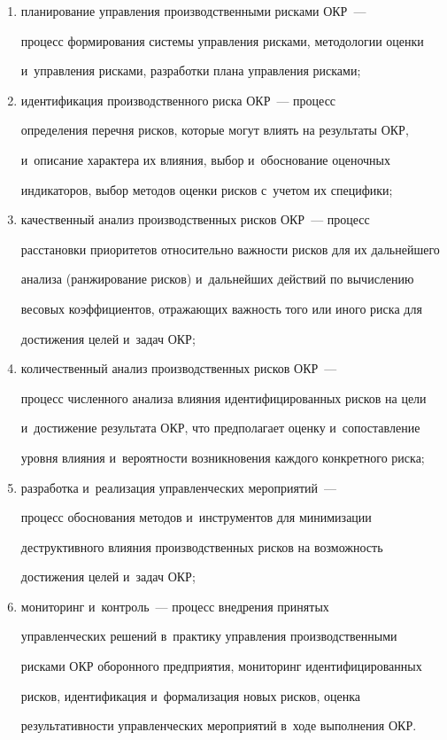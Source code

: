       \begin{enumerate}[(1)]


      \item  планирование управления производственными рисками ОКР~--- 


процесс формирования системы управ\-ле\-ния рисками, методологии оценки 


и~управ\-ле\-ния рисками, разработки плана управ\-ле\-ния рисками;


      \item идентификация производственного риска ОКР~--- процесс 


определения перечня рисков, которые могут влиять на результаты ОКР, 


и~описание характера их влияния, выбор и~обоснование оценочных 


индикаторов, выбор методов оценки рисков с~учетом их специфики; 


      \item качественный анализ производственных рисков ОКР~--- процесс 


расстановки приоритетов относительно важности рисков для их дальнейшего 


анализа (ранжирование рисков) и~дальнейших действий по вычислению 


весовых коэффициентов, отражающих важность того или иного риска для 


достижения целей и~задач ОКР;


      \item  количественный анализ производственных рисков ОКР~--- 


процесс численного анализа влияния идентифицированных рисков на цели 


и~достижение результата ОКР, что предполагает оценку и~сопоставление 


уровня влияния и~вероятности возникновения каждого конкретного риска;


      \item разработка и~реализация управленческих мероприятий~--- 


процесс обоснования методов и~инструментов для минимизации 


деструктивного влияния производственных рисков на возможность 


достижения целей и~задач ОКР;


      \item  мониторинг и~контроль~--- процесс внедрения принятых 


управленческих решений в~практику управления производственными 


рисками ОКР оборонного предприятия, мониторинг идентифицированных 


рисков, идентификация и~формализация новых рисков, оценка 


результативности управленческих мероприятий в~ходе выполнения ОКР.


      \end{enumerate}


